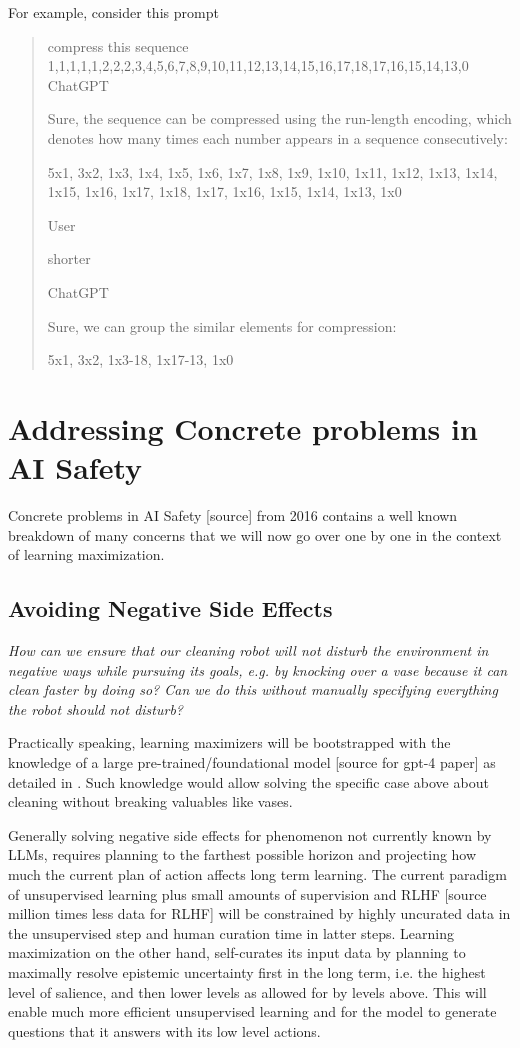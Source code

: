 \documentclass{article}
\begin{document}
For example, consider this prompt
\begin{quotation}

compress this sequence 1,1,1,1,1,2,2,2,3,4,5,6,7,8,9,10,11,12,13,14,15,16,17,18,17,16,15,14,13,0
ChatGPT

Sure, the sequence can be compressed using the run-length encoding, which denotes how many times each number appears in a sequence consecutively:

5x1, 3x2, 1x3, 1x4, 1x5, 1x6, 1x7, 1x8, 1x9, 1x10, 1x11, 1x12, 1x13, 1x14, 1x15, 1x16, 1x17, 1x18, 1x17, 1x16, 1x15, 1x14, 1x13, 1x0

User

shorter

ChatGPT

Sure, we can group the similar elements for compression:

5x1, 3x2, 1x3-18, 1x17-13, 1x0
\end{quotation}

\newpage

\section{Addressing Concrete problems in AI Safety}

Concrete problems in AI Safety [source] from 2016 contains a well known breakdown of many concerns that we will now go over one by one in the context of learning maximization.

\subsection{Avoiding Negative Side Effects}
\textit{How can we ensure that our cleaning robot will not
disturb the environment in negative ways while pursuing its goals, e.g. by knocking over a vase because it can clean faster by doing so? Can we do this without manually specifying everything the robot should not disturb?}

\hspace{}

Practically speaking, learning maximizers will be bootstrapped with the knowledge of a large pre-trained/foundational model [source for gpt-4 paper] as detailed in . Such knowledge would allow solving the specific case above about cleaning without breaking valuables like vases.

Generally solving negative side effects for phenomenon not currently known by LLMs, requires planning to the farthest possible horizon and projecting how much the current plan of action affects long term learning. The current paradigm of unsupervised learning plus small amounts of supervision and RLHF [source million times less data for RLHF] will be constrained by highly uncurated data in the unsupervised step and human curation time in latter steps. Learning maximization on the other hand, self-curates its input data by planning to maximally resolve epistemic uncertainty first in the long term, i.e. the highest level of salience, and then lower levels as allowed for by levels above. This will enable much more efficient unsupervised learning and for the model to generate questions that it answers with its low level actions.
\end{document}
